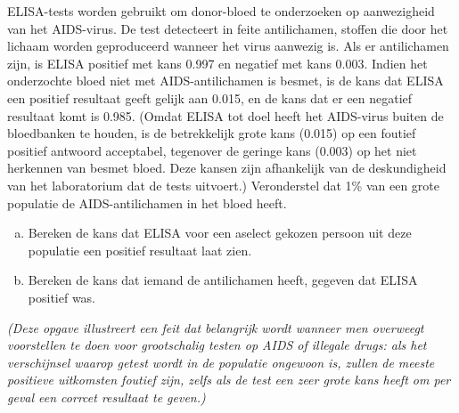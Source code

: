 \documentclass[12pt,twoside]{article}
\begin{document}
\begin{oefening} %
ELISA-tests worden gebruikt om donor-bloed te onderzoeken op aanwezigheid van het AIDS-virus. De test detecteert in feite antilichamen, stoffen die door het lichaam worden geproduceerd wanneer het virus aanwezig is. Als er antilichamen zijn, is ELISA positief met kans 0.997 en negatief met kans 0.003. Indien het onderzochte bloed niet met AIDS-antilichamen is besmet, is de kans dat ELISA een positief resultaat geeft gelijk aan 0.015, en de kans dat er een negatief resultaat komt is 0.985. (Omdat ELISA tot doel heeft het AIDS-virus buiten de bloedbanken te houden, is de betrekkelijk grote kans (0.015) op een foutief positief antwoord acceptabel, tegenover de geringe kans (0.003) op het niet herkennen van besmet bloed. Deze kansen zijn afhankelijk van de deskundigheid van het laboratorium dat de tests uitvoert.) Veronderstel dat 1\% van een grote populatie de AIDS-antilichamen in het bloed heeft.
\begin{enumerate}[(a)]
  \item Bereken de kans dat ELISA voor een aselect gekozen persoon uit deze populatie een positief resultaat laat zien.
  \item Bereken de kans dat iemand de antilichamen heeft, gegeven dat ELISA positief was.
\end{enumerate}
{\em (Deze opgave illustreert een feit dat belangrijk wordt wanneer men overweegt voorstellen te doen voor grootschalig testen op AIDS of illegale drugs: als het verschijnsel waarop getest wordt in de populatie ongewoon is, zullen de meeste positieve uitkomsten foutief zijn, zelfs als de test een zeer grote kans heeft om per geval een corrcet resultaat te geven.)}
\end{oefening}
\end{document}
